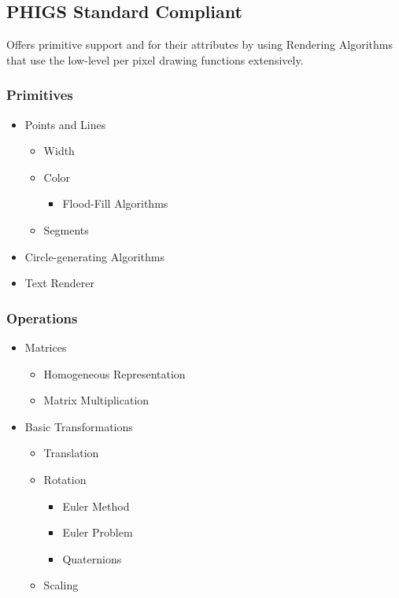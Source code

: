 
        \subsection*{PHIGS Standard Compliant}
            Offers primitive support and for their attributes by using Rendering Algorithms that use the low-level per pixel drawing functions extensively.

            \subsubsection*{Primitives}
                \begin{itemize}
                  \item Points and Lines
                  \begin{itemize}
                    \item Width
                    \item Color
                    \begin{itemize}
                      \item Flood-Fill Algorithms
                    \end{itemize}
                    \item Segments
                  \end{itemize}
                  \item Circle-generating Algorithms
                  \item Text Renderer
                \end{itemize}

            \subsubsection*{Operations}
              \begin{itemize}
                \item Matrices
                \begin{itemize}
                  \item Homogeneous Representation
                  \item Matrix      Multiplication
                \end{itemize}

                \item Basic Transformations
                \begin{itemize}
                    \item Translation
                    \item Rotation
                    \begin{itemize}
                        \item Euler Method
                        \item Euler Problem
                        \item Quaternions
                    \end{itemize}
                    \item Scaling
                \end{itemize}
                \end{itemize}
